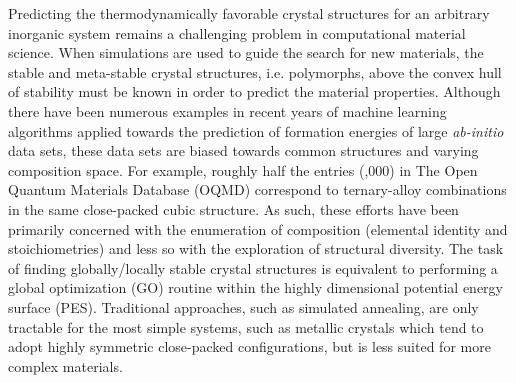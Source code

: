 Predicting the thermodynamically favorable crystal structures for an arbitrary inorganic system remains a challenging problem in computational material science.\cite{}
%
%
When simulations are used to guide the search for new materials, the stable and meta-stable crystal structures, i.e. polymorphs,  above the convex hull of stability must be known in order to predict the material properties.\cite{}
Although there have been numerous examples in recent years of machine learning algorithms applied towards the prediction of formation energies of large {\it ab-initio} data sets,
these data sets are biased towards common structures and varying composition space.\cite{}
For example, roughly half the entries (,000) in The Open Quantum Materials Database (OQMD) correspond to ternary-alloy combinations in the same close-packed cubic structure.
As such, these efforts have been primarily concerned with the enumeration of composition (elemental identity and stoichiometries) and less so with the exploration of structural diversity.
%
The task of finding globally/locally stable crystal structures is equivalent to performing a global optimization (GO) routine within the highly dimensional potential energy surface (PES).
%
Traditional approaches, such as simulated annealing, are only tractable for the most simple systems,
such as metallic crystals which tend to adopt highly symmetric close-packed configurations, but is less suited for more complex materials.
